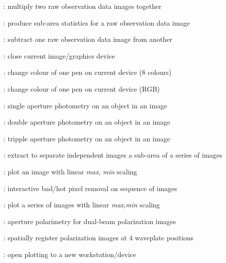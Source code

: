 \begin{description}
\begin{description}
\item []: multiply two raw observation data
images together

\item []: produce sub-area statistics for a raw
observation data image

\item []: subtract one raw observation data image
from another

\item []: close current image/graphics device

\item []: change colour of one pen on current
device (8 colours)

\item []: change colour of one pen on current
device (RGB)

\item []: single aperture photometry on an object in
an image

\item []: double aperture photometry on an object
in an image

\item []: tripple aperture photometry on an object
in an image

\item []: extract to separate independent
images a sub-area of a series of images

\item []: plot an image with linear {\it max},{\it
min} scaling

\item []: interactive bad/hot pixel
removal on sequence of images

\item []: plot a series of images with linear
{\it max},{\it min} scaling

\item []: aperture polarimetry for dual-beam
polarization images

\item []: spatially register polarization
images at 4 waveplate positions

\item []: open plotting to a new
workstation/device


\end{description}
\end{description}
